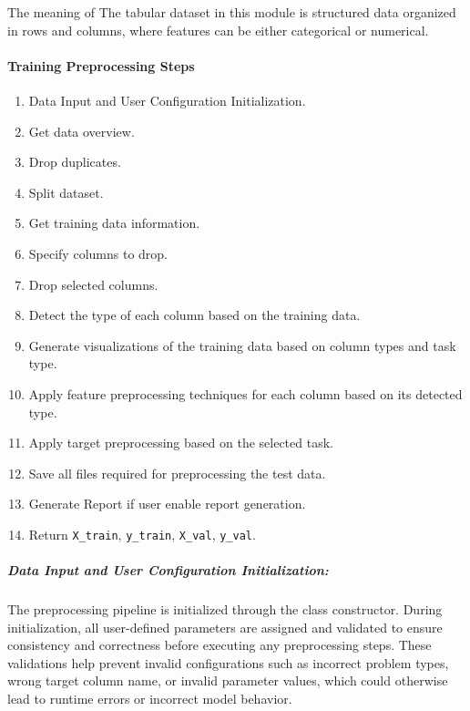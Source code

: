 The meaning of The tabular dataset in this module is structured data organized in rows and columns, where features can be either categorical or numerical.
\vspace{0.5cm}


\paragraph{Training Preprocessing Steps}
\begin{enumerate}
  \item Data Input and User Configuration Initialization.
  \item Get data overview.
  \item Drop duplicates.
  \item Split dataset.
  \item Get training data information.
  \item Specify columns to drop.
  \item Drop selected columns.
  \item Detect the type of each column based on the training data.
  \item Generate visualizations of the training data based on column types and task type.
  \item Apply feature preprocessing techniques for each column based on its detected type.
  \item Apply target preprocessing based on the selected task.
  \item Save all files required for preprocessing the test data.
  \item Generate Report if user enable report generation.
  \item Return \texttt{X\_train}, \texttt{y\_train}, \texttt{X\_val}, \texttt{y\_val}.
\end{enumerate}

\vspace{5cm}
\subparagraph{Data Input and User Configuration Initialization:}
The preprocessing pipeline is initialized through the class constructor. 
During initialization, all user-defined parameters are assigned and validated to ensure consistency and correctness before executing any preprocessing steps. 
These validations help prevent invalid configurations such as incorrect problem types, wrong target column name, or invalid parameter values, which could otherwise lead to runtime errors or incorrect model behavior.
\vspace{0.3cm}

\vspace{0.3cm}

